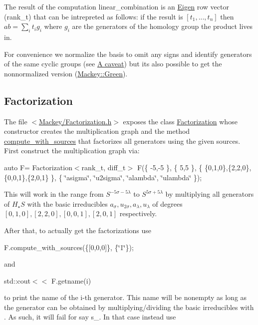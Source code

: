 The result of the computation {\ttfamily linear\+\_\+combination} is an \hyperlink{namespaceEigen}{Eigen} row vector ({\ttfamily rank\+\_\+t}) that can be intrepreted as follows\+: if the result is $[t_1,...,t_n]$ then $ ab=\sum_it_ig_i$ where $g_i$ are the generators of the homology group the product lives in.

For convenience we normalize the basis to omit any signs and identify generators of the same cyclic groups (see \hyperlink{math_caveat}{A caveat}) but it\textquotesingle{}s also possible to get the nonnormalized version (\hyperlink{classMackey_1_1Green}{Mackey\+::\+Green}).\hypertarget{use_step1fact}{}\subsection{Factorization}\label{use_step1fact}
The file {\ttfamily $<$\hyperlink{Factorization_8h}{Mackey/\+Factorization.\+h}$>$} exposes the class \hyperlink{classMackey_1_1Factorization}{Factorization} whose constructor creates the multiplication graph and the method \hyperlink{classMackey_1_1Factorization_a2e135a37687fc3d69cd16a8729dd19eb}{compute\+\_\+with\+\_\+sources} that factorizes all generators using the given sources. First construct the multiplication graph via\+:

{\ttfamily auto F= Factorization$<$rank\+\_\+t, diff\+\_\+t$>$ F(\{ -\/5,-\/5 \}, \{ 5,5 \}, \{ \{0,1,0\},\{2,2,0\},\{0,0,1\},\{2,0,1\} \}, \{ \char`\"{}asigma\char`\"{}, \char`\"{}u2sigma\char`\"{}, \char`\"{}alambda\char`\"{}, \char`\"{}ulambda\char`\"{} \});}

This will work in the range from $S^{-5\sigma-5\lambda}$ to $S^{5\sigma+5\lambda}$ by multiplying all generators of $H_{\star}S$ with the basic irreducibles $ a_{\sigma}, u_{2\sigma}, a_{\lambda}, u_{\lambda}$ of degrees $[0,1,0],[2,2,0],[0,0,1],[2,0,1]$ respectively.

After that, to actually get the factorizations use

{\ttfamily F.\+compute\+\_\+with\+\_\+sources(\{\mbox{[}0,0,0\mbox{]}\}, \{\char`\"{}1\char`\"{}\});}

and

{\ttfamily std\+::cout$<$$<$ F.\+getname(i) }

to print the name of the {\ttfamily i}-\/th generator. This name will be nonempty as long as the generator can be obtained by multiplying/dividing the basic irreducibles with {}. As such, it will fail for say {\ttfamily s\+\_}. In that case instead use

